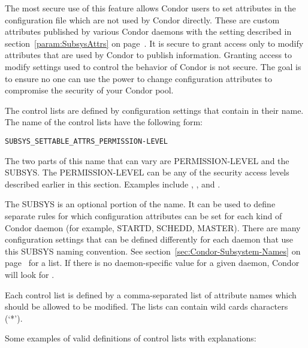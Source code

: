 The most secure use of this feature allows Condor users to set
attributes in the configuration file which are not used by Condor
directly.
These are custom attributes published by various Condor
daemons with the  setting described in
section~\ref{param:SubsysAttrs} on page~\pageref{param:SubsysAttrs}.
It is secure to grant access only to modify attributes that are used by Condor
to publish information.
Granting access to modify
settings used to control the behavior of Condor is
not secure.
The goal is to
ensure no
one can use the power to change configuration attributes to compromise 
the security of your Condor pool.

The control lists are defined by configuration settings that contain 
 in their name.
The name of the control lists have the following form: 

\footnotesize
\begin{verbatim}
SUBSYS_SETTABLE_ATTRS_PERMISSION-LEVEL
\end{verbatim}
\normalsize

The two parts of this name that can vary are
PERMISSION-LEVEL and the SUBSYS.
The PERMISSION-LEVEL can be any of the security access levels
described earlier in this section.
Examples include , , and .

The SUBSYS is an optional portion of the name. 
It can be used to
define separate rules for which configuration attributes can be set
for each kind of Condor daemon (for example, STARTD, SCHEDD, MASTER).
There are many configuration settings that can be defined differently
for each daemon that use this SUBSYS naming convention.
See section~\ref{sec:Condor-Subsystem-Names} on
page~\pageref{sec:Condor-Subsystem-Names} for a list.
If there is no daemon-specific value for a given daemon, Condor will
look for .

Each control list is defined by a comma-separated list of attribute
names which should be allowed to be modified.
The lists can contain wild cards characters (`*'). 

Some examples of valid definitions of control lists with explanations:

